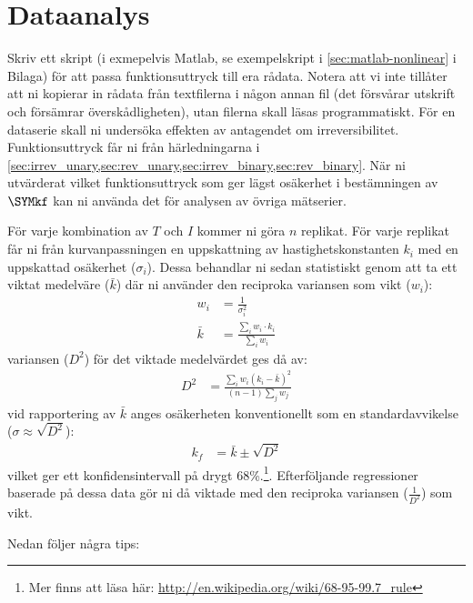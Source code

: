 \section{Dataanalys}
\label{sec:analys}
Skriv ett skript (i exmepelvis Matlab, se exempelskript i
\cref{sec:matlab-nonlinear} i Bilaga) för att passa funktionsuttryck till
era rådata. Notera att vi inte tillåter att ni kopierar in rådata från
textfilerna i någon annan fil (det försvårar utskrift och försämrar
överskådligheten), utan filerna skall läsas programmatiskt. För en
dataserie skall ni undersöka effekten av antagendet om
irreversibilitet. Funktionsuttryck får ni från härledningarna i
\cref{sec:irrev_unary,sec:rev_unary,sec:irrev_binary,sec:rev_binary}.
När ni utvärderat vilket funktionsuttryck som ger lägst osäkerhet i
bestämningen av $\SYMkf$ kan ni använda det för analysen av övriga
mätserier.

För varje kombination av $T$ och $I$ kommer ni göra $n$ replikat. För
varje replikat får ni från kurvanpassningen en uppskattning av
hastighetskonstanten $k_i$ med en uppskattad osäkerhet
($\sigma_i$). Dessa behandlar ni sedan statistiskt genom att ta ett
viktat medelväre ($\bar{k}$) där ni använder den reciproka variansen som
vikt ($w_i$):
\begin{align}
  w_i &= \frac{1}{\sigma_i^2} \\
  \bar{k} &= \frac{\sum_i{w_i \cdot k_i}}{\sum_i{w_i}}
\end{align}
variansen ($D^2$) för det viktade medelvärdet ges då av:
\begin{align}
   D^2 &= \frac{\sum_i w_i(k_i - \bar{k})^2}{(n - 1)\sum_j w_j}
\end{align}
vid rapportering av $\bar{k}$ anges osäkerheten konventionellt som en
standardavvikelse ($\sigma \approx \sqrt{D^2}$):
\begin{align}
  k_f &= \bar{k} \pm \sqrt{D^2}
\end{align}
vilket ger ett konfidensintervall på drygt 68\%.\footnote{
Mer finns att läsa här:
\url{http://en.wikipedia.org/wiki/68-95-99.7\_rule}
}. Efterföljande regressioner baserade på dessa
data gör ni då viktade med den reciproka variansen ($\frac{1}{D^2}$) som
vikt.

Nedan följer några tips:


